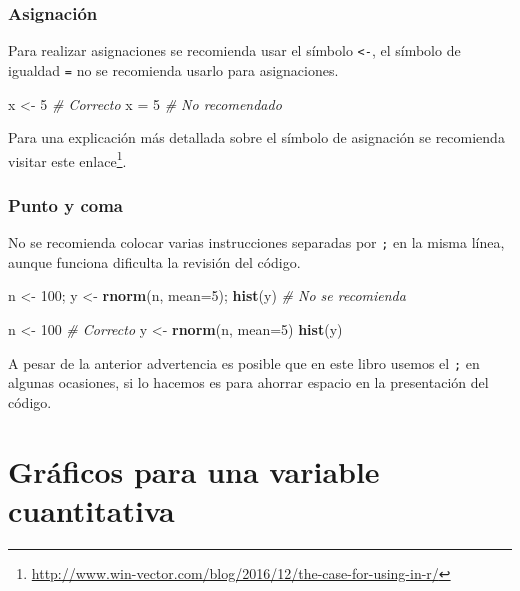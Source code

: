 \documentclass[10pt,]{krantz}
\makeatletter
\newenvironment{Shaded}{\begin{snugshade}}{\end{snugshade}}
\newcommand{\KeywordTok}[1]{\textcolor[rgb]{0.13,0.29,0.53}{\textbf{#1}}}
\newcommand{\DataTypeTok}[1]{\textcolor[rgb]{0.13,0.29,0.53}{#1}}
\newcommand{\DecValTok}[1]{\textcolor[rgb]{0.00,0.00,0.81}{#1}}
\newcommand{\StringTok}[1]{\textcolor[rgb]{0.31,0.60,0.02}{#1}}
\newcommand{\CommentTok}[1]{\textcolor[rgb]{0.56,0.35,0.01}{\textit{#1}}}
\newcommand{\NormalTok}[1]{#1}
\renewcommand{\href}[2]{#2\footnote{\url{#1}}}
\newenvironment{kframe}{%
\medskip{}
\setlength{\fboxsep}{.8em}
 \def\at@end@of@kframe{}%
 \ifinner\ifhmode%
  \def\at@end@of@kframe{\end{minipage}}%
  \begin{minipage}{\columnwidth}%
 \fi\fi%
 \def\FrameCommand##1{\hskip\@totalleftmargin \hskip-\fboxsep
 \colorbox{shadecolor}{##1}\hskip-\fboxsep
     \hskip-\linewidth \hskip-\@totalleftmargin \hskip\columnwidth}%
 \MakeFramed {\advance\hsize-\width
   \@totalleftmargin\z@ \linewidth\hsize
   \@setminipage}}%
 {\par\unskip\endMakeFramed%
 \at@end@of@kframe}
\renewenvironment{Shaded}{\begin{kframe}}{\end{kframe}}
\makeatother
\begin{document}
\subsection{Asignación}

Para realizar asignaciones se recomienda usar el símbolo
\texttt{\textless{}-}, el símbolo de igualdad \texttt{=} no se
recomienda usarlo para asignaciones.

\begin{Shaded}
\begin{Highlighting}[]
\NormalTok{x <-}\StringTok{ }\DecValTok{5}  \CommentTok{# Correcto}
\NormalTok{x =}\StringTok{ }\DecValTok{5}   \CommentTok{# No recomendado}
\end{Highlighting}
\end{Shaded}

Para una explicación más detallada sobre el símbolo de asignación se
recomienda visitar este
\href{http://www.win-vector.com/blog/2016/12/the-case-for-using-in-r/}{enlace}.

\subsection{Punto y coma}

No se recomienda colocar varias instrucciones separadas por \texttt{;}
en la misma línea, aunque funciona dificulta la revisión del código.

\begin{Shaded}
\begin{Highlighting}[]
\NormalTok{n <-}\StringTok{ }\DecValTok{100}\NormalTok{; y <-}\StringTok{ }\KeywordTok{rnorm}\NormalTok{(n, }\DataTypeTok{mean=}\DecValTok{5}\NormalTok{); }\KeywordTok{hist}\NormalTok{(y)  }\CommentTok{# No se recomienda}

\NormalTok{n <-}\StringTok{ }\DecValTok{100}                                  \CommentTok{# Correcto}
\NormalTok{y <-}\StringTok{ }\KeywordTok{rnorm}\NormalTok{(n, }\DataTypeTok{mean=}\DecValTok{5}\NormalTok{)}
\KeywordTok{hist}\NormalTok{(y)}
\end{Highlighting}
\end{Shaded}

A pesar de la anterior advertencia es posible que en este libro usemos
el \texttt{;} en algunas ocasiones, si lo hacemos es para ahorrar
espacio en la presentación del código.

\chapter{Gráficos para una variable
cuantitativa}\label{graficos-para-una-variable-cuantitativa}
\end{document}
